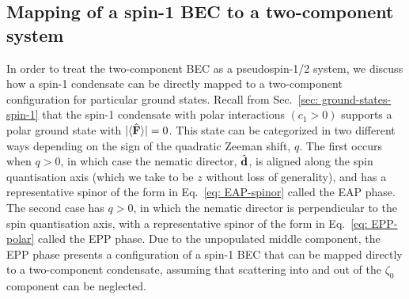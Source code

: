\subsection{Mapping of a spin-1 BEC to a two-component system}
In order to treat the two-component BEC as a pseudospin-1/2 system, we discuss
how a spin-1 condensate can be directly mapped to a two-component configuration
for particular ground states.
Recall from Sec.~\ref{sec: ground-states-spin-1} that the spin-1 condensate
with polar interactions \((c_1 > 0)\) supports a polar ground state with
\(|\langle \hat{\vb{F}} \rangle |=0\).
This state can be categorized in two different ways depending on the sign of the
quadratic Zeeman shift, \(q\).
The first occurs when \(q > 0\), in which case the nematic director,
\(\hat{\vb{d}}\), is aligned along the spin quantisation axis (which we take to
be \(z\) without loss of generality), and has a representative spinor of the
form in Eq.~\eqref{eq: EAP-spinor} called the EAP phase.
The second case has \(q > 0\), in which the nematic director is perpendicular to
the spin quantisation axis, with a representative spinor of the form in
Eq.~\eqref{eq: EPP-polar} called the EPP phase.
Due to the unpopulated middle component, the EPP phase presents a configuration
of a spin-1 BEC that can be mapped directly to a two-component condensate,
assuming that scattering into and out of the \(\zeta_0\) component can be
neglected.

